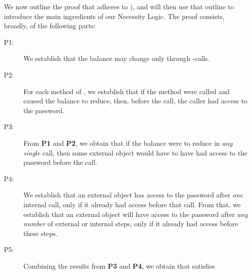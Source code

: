 
We  now outline the proof that  adheres to ),
and  will then use that outline to 
 introduce the main ingredients of our Necessity Logic. The proof consists,
broadly, of the following parts:


\begin{description}
\item[P1:] We establish that the balance 
 may change only   through -\internalC calls.  

\item[P2:] 
For each method of ,  we establish that   
if the method were called and  caused the  balance to reduce, then, before the call,
the caller had access  to the password.

\item[P3:]  
From \textbf{P1} and \textbf{P2}, we obtain that if the balance were to 
reduce in \emph{any}  \emph{single} call, then some
external object would have to have had access to the password before the call.

\item[P4:] We establish %
that   an external object has access to 
the password after \emph{one} internal call, only if it already had access before that call.
From that, we establish  that  an external object will have access to 
the password after \emph{any number} of external or internal 
steps, only if it already had access before these steps.

\item[P5:] Combining  the results from \textbf{P3} and \textbf{P4}, we obtain
that   satisfies 

\end{description} 
 
